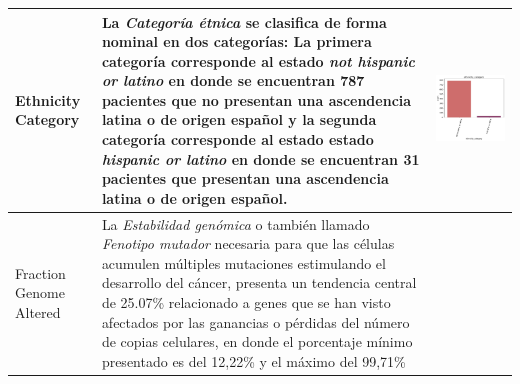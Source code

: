 \begin{table}[!htb]
\begin{threeparttable}
\begin{tabular}{p{2.5cm} p{7cm} p{6.5cm}}
			Ethnicity Category
			&La \textit{Categoría étnica} se clasifica de forma nominal en dos categorías: La primera categoría corresponde al estado \textit{not hispanic or latino} en donde se encuentran 787 pacientes que no presentan una ascendencia latina o de origen español y la segunda categoría corresponde al estado estado \textit{hispanic or latino} en donde se encuentran 31 pacientes que presentan una ascendencia latina o de origen español.
			& \begin{center}\includegraphics[width=1\linewidth]{NOTEBOOK/IMAGENES_DESCRIPTIVAS/13_ethnicity_category}\end{center}
			\\ \hline
			
			Fraction Genome Altered
			& La \textit{Estabilidad genómica} o también llamado \textit{Fenotipo mutador} necesaria para que las células acumulen múltiples mutaciones estimulando el desarrollo del cáncer, presenta un tendencia central de 25.07\% relacionado a genes que se han visto afectados por las ganancias o pérdidas del número de copias celulares, en donde el porcentaje mínimo presentado es del 12,22\% y el máximo del 99,71\%
			

\end{tabular}
\end{threeparttable}
\end{table}
